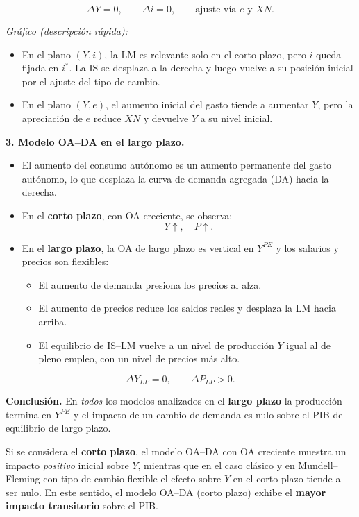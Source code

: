 \documentclass[11pt,addpoints]{article}
\begin{document}
\[
\Delta Y = 0, \qquad \Delta i = 0, \qquad \text{ajuste vía } e \text{ y } XN.
\]

\emph{Gráfico (descripción rápida):}
\begin{itemize}
  \item En el plano $(Y,i)$, la LM es relevante solo en el corto plazo, pero $i$ queda fijada en $i^*$. La IS se desplaza a la derecha y luego vuelve a su posición inicial por el ajuste del tipo de cambio.
  \item En el plano $(Y,e)$, el aumento inicial del gasto tiende a aumentar $Y$, pero la apreciación de $e$ reduce $XN$ y devuelve $Y$ a su nivel inicial.
\end{itemize}

\medskip

\textbf{3. Modelo OA--DA en el largo plazo.}

\begin{itemize}
  \item El aumento del consumo autónomo es un aumento permanente del gasto autónomo, lo que desplaza la curva de demanda agregada (DA) hacia la derecha.
  \item En el \textbf{corto plazo}, con OA creciente, se observa:
  \[
  Y \uparrow, \quad P \uparrow.
  \]
  \item En el \textbf{largo plazo}, la OA de largo plazo es vertical en $Y^{PE}$ y los salarios y precios son flexibles:
  \begin{itemize}
    \item El aumento de demanda presiona los precios al alza.
    \item El aumento de precios reduce los saldos reales y desplaza la LM hacia arriba.
    \item El equilibrio de IS--LM vuelve a un nivel de producción $Y$ igual al de pleno empleo, con un nivel de precios más alto.
  \end{itemize}
\end{itemize}

\[
\Delta Y_{LP} = 0, \qquad \Delta P_{LP} > 0.
\]

\medskip

\textbf{Conclusión.}  
En \emph{todos} los modelos analizados en el \textbf{largo plazo} la producción termina en $Y^{PE}$ y el impacto de un cambio de demanda es nulo sobre el PIB de equilibrio de largo plazo.  

Si se considera el \textbf{corto plazo}, el modelo OA--DA con OA creciente muestra un impacto \emph{positivo} inicial sobre $Y$, mientras que en el caso clásico y en Mundell--Fleming con tipo de cambio flexible el efecto sobre $Y$ en el corto plazo tiende a ser nulo. En este sentido, el modelo OA--DA (corto plazo) exhibe el \textbf{mayor impacto transitorio} sobre el PIB.
\end{document}
